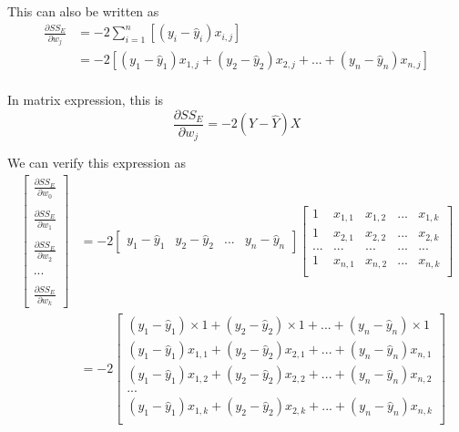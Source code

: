 \documentclass[
	letterpaper
]{article}
\begin{document}
This can also be written as 
\begin{equation}
\begin{split}
\frac{\partial SS_E}{\partial w_j} & =-2\sum_{i = 1}^n\left[(y_i - \hat y_i)  x_{i,j}\right]\\
&=-2\left[(y_1 - \hat y_1)  x_{1,j} + (y_2 - \hat y_2)  x_{2,j} + ... + (y_n - \hat y_n)  x_{n,j}\right]\\
\end{split}
\end{equation}

In matrix expression, this is
\begin{equation}
\frac{\partial SS_E}{\partial w_j} = -2 (Y - \hat Y)X
\end{equation}

We can verify this expression as 
\begin{equation}
\begin{split}
\begin{bmatrix}\frac{\partial SS_E}{\partial w_0} \\ \\ \frac{\partial SS_E}{\partial w_1} \\ \\  \frac{\partial SS_E}{\partial w_2}  \\ \\ ... \\  \\ \frac{\partial SS_E}{\partial w_k}\end{bmatrix}
& = -2 \begin{bmatrix}y_1 - \hat y_1 & y_2 - \hat y_2 & ... & y_n - \hat y_n\end{bmatrix}
\begin{bmatrix}
1 & x_{1, 1} & x_{1, 2} & ... & x_{1, k} \\
1 & x_{2, 1} & x_{2, 2} & ... & x_{2, k} \\
... & ... & ... & ... & ... \\
1 & x_{n, 1} & x_{n, 2} & ... & x_{n, k} \\
\end{bmatrix}\\
& = -2 \begin{bmatrix}
(y_1 - \hat y_1)\times 1  + (y_2 - \hat y_2) \times 1 + ... + (y_n - \hat y_n) \times 1 \\
(y_1 - \hat y_1)  x_{1,1} + (y_2 - \hat y_2)  x_{2,1} + ... + (y_n - \hat y_n)  x_{n,1}\\
(y_1 - \hat y_1)  x_{1,2} + (y_2 - \hat y_2)  x_{2,2} + ... + (y_n - \hat y_n)  x_{n,2}\\
...\\
(y_1 - \hat y_1)  x_{1,k} + (y_2 - \hat y_2)  x_{2,k} + ... + (y_n - \hat y_n)  x_{n,k}\\
\end{bmatrix}
\end{split}
\end{equation}
\end{document}
